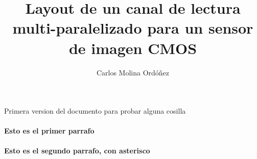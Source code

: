 \documentclass[12pt,a4paper,oneside,titlepage]{report}
\author{Carlos Molina Ordóñez}
\title{Layout de un canal de lectura multi-paralelizado para un sensor de imagen CMOS}
\begin{document}
Primera version del documento para probar alguna cosilla

\paragraph{Esto es el primer parrafo}

\paragraph*{Esto es el segundo parrafo, con asterisco}
\end{document}
